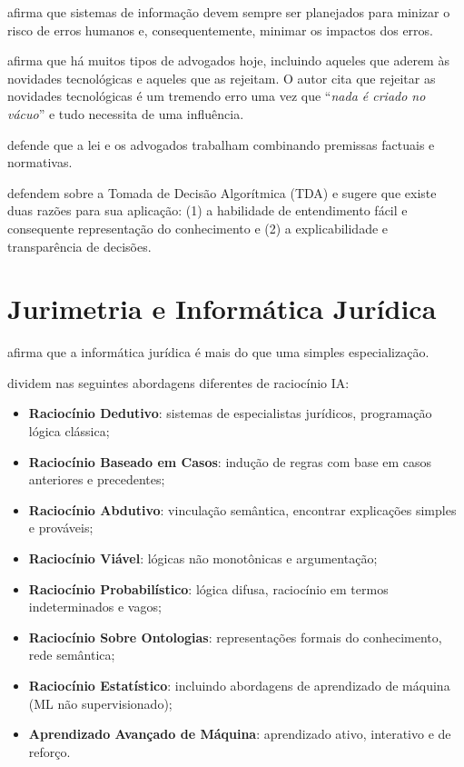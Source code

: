 \documentclass[
]{book}
\providecommand{\tightlist}{%
  \setlength{\itemsep}{0pt}\setlength{\parskip}{0pt}}
\begin{document}
\citet{Saarenpaä2018} afirma que sistemas de informação devem sempre ser planejados para minizar o risco de erros humanos e, consequentemente, minimar os impactos dos erros.

\citet{Saarenpaä2018} afirma que há muitos tipos de advogados hoje, incluindo aqueles que aderem às novidades tecnológicas e aqueles que as rejeitam. O autor cita que rejeitar as novidades tecnológicas é um tremendo erro uma vez que ``\emph{nada é criado no vácuo}'' e tudo necessita de uma influência.

\citet{Saarenpaä2018} defende que a lei e os advogados trabalham combinando premissas factuais e normativas.

\citet{Waltl2018} defendem sobre a Tomada de Decisão Algorítmica (TDA) e sugere que existe duas razões para sua aplicação: (1) a habilidade de entendimento fácil e consequente representação do conhecimento e (2) a explicabilidade e transparência de decisões.

\hypertarget{jurimetria-e-informuxe1tica-juruxeddica}{%
\section{Jurimetria e Informática Jurídica}\label{jurimetria-e-informuxe1tica-juruxeddica}}

\citet{Saarenpaä2018} afirma que a informática jurídica é mais do que uma simples especialização.

\citet{Waltl2018} dividem nas seguintes abordagens diferentes de raciocínio IA:

\begin{itemize}
\tightlist
\item
  \textbf{Raciocínio Dedutivo}: sistemas de especialistas jurídicos, programação lógica clássica;
\item
  \textbf{Raciocínio Baseado em Casos}: indução de regras com base em casos anteriores e precedentes;
\item
  \textbf{Raciocínio Abdutivo}: vinculação semântica, encontrar explicações simples e prováveis;
\item
  \textbf{Raciocínio Viável}: lógicas não monotônicas e argumentação;
\item
  \textbf{Raciocínio Probabilístico}: lógica difusa, raciocínio em termos indeterminados e vagos;
\item
  \textbf{Raciocínio Sobre Ontologias}: representações formais do conhecimento, rede semântica;
\item
  \textbf{Raciocínio Estatístico}: incluindo abordagens de aprendizado de máquina (ML não supervisionado);
\item
  \textbf{Aprendizado Avançado de Máquina}: aprendizado ativo, interativo e de reforço.
\end{itemize}
\end{document}
